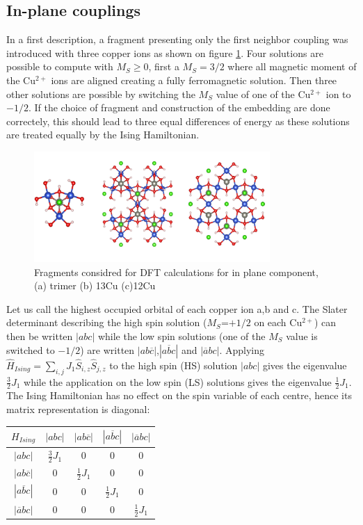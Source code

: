 \documentclass[10pt]{report}
\numberwithin{equation}{section}
\begin{document}
\subsection*{In-plane couplings}

In a first description, a fragment presenting only the first neighbor coupling was introduced with three copper ions as shown on figure \ref{FragmentDFT}.
Four solutions are possible to compute with $M_S$$\ge$$0$, first a $M_S=3/2$ where all magnetic moment of the Cu$^{2+}$ ions are aligned creating a fully ferromagnetic solution. 
Then three other solutions are possible by switching the $M_S$ value of one of the Cu$^{2+}$ ion to $-1/2$. 
If the choice of fragment and construction of the embedding are done correctely, this should lead to three equal differences of energy as these solutions are treated equally by the Ising Hamiltonian.

\begin{figure}[h!]
    \centering
    \includegraphics[width=0.8\textwidth]{Images/FragmentDFT_plan.png}
    \caption{Fragments considred for DFT calculations for in plane component, (a) trimer (b) 13Cu (c)12Cu}
    \label{FragmentDFT}
\end{figure}

Let us call the highest occupied orbital of each copper ion a,b and c. 
The Slater determinant describing the high spin solution ($M_S$=$+1/2$ on each Cu$^{2+}$) can then be written $|abc|$ while the low spin solutions (one of the $M_S$ value is switched to $-1/2$) are written $|ab\overline{c}|$,$|a\overline{b}c|$ and $|\overline{a}bc|$.
Applying $\hat{H}_{Ising}=\sum_{i,j}J_1 \hat{S}_{i,z}\hat{S}_{j,z}$ to the high spin (HS) solution $|abc|$ gives the eigenvalue $\frac{3}{2}J_1$ while the application on the low spin (LS) solutions gives the eigenvalue $\frac{1}{2}J_1$. 
The Ising Hamiltonian has no effect on the spin variable of each centre, hence its matrix representation is diagonal:

\begin{center}
    \begin{tabular}{c | c c c c}
        $H_{Ising}$ & $|abc|$ & $|ab\overline{c}|$&$|a\overline{b}c|$ & $|\overline{a}bc|$\\
        \hline
        $|abc|$ & $\frac{3}{2}J_1$ & 0 & 0 & 0\\
        $|ab\overline{c}|$ & 0 & $\frac{1}{2}J_1 $& 0 & 0\\
        $|a\overline{b}c|$ & 0 & 0 & $\frac{1}{2}J_1 $ & 0 \\
        $|\overline{a}bc|$ & 0 & 0 & 0 & $\frac{1}{2}J_1 $
    \end{tabular}
\end{center}
\end{document}

